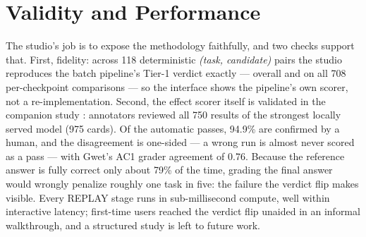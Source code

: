 \documentclass[letterpaper]{article} %
\begin{document}
\section{Validity and Performance}

The studio's job is to expose the methodology faithfully, and two checks support
that. First, fidelity: across 118 deterministic \emph{(task, candidate)} pairs
the studio reproduces the batch pipeline's Tier-1 verdict exactly --- overall and
on all 708 per-checkpoint comparisons --- so the interface shows the pipeline's
own scorer, not a re-implementation. Second, the effect scorer itself is
validated in the companion study \citep{dynamicmcpbench2026}: annotators reviewed
all 750 results of the strongest locally served model (975 cards). Of the
automatic passes, 94.9\% are confirmed by a human, and the disagreement is
one-sided --- a wrong run is almost never scored as a pass --- with Gwet's AC1
grader agreement of 0.76. Because the reference answer is fully correct only
about 79\% of the time, grading the final answer would wrongly penalize roughly
one task in five: the failure the verdict flip makes visible. Every REPLAY stage
runs in sub-millisecond compute, well within interactive latency; first-time
users reached the verdict flip unaided in an informal walkthrough, and a
structured study is left to future work.


\end{document}
